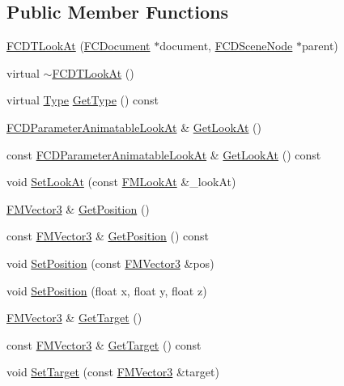 \subsection*{Public Member Functions}
\begin{DoxyCompactItemize}
\item 
\hyperlink{classFCDTLookAt_a8503ff0935502f743f1234cea3182ee0}{FCDTLookAt} (\hyperlink{classFCDocument}{FCDocument} $\ast$document, \hyperlink{classFCDSceneNode}{FCDSceneNode} $\ast$parent)
\item 
virtual \hyperlink{classFCDTLookAt_ae544b67a4f54cc5f8a1a64d2de11292a}{$\sim$FCDTLookAt} ()
\item 
virtual \hyperlink{classFCDTransform_a13e561c5e53aeaf84dedf4661cdc8921}{Type} \hyperlink{classFCDTLookAt_a1f3fc1c2e95176026628276ddf6f30a0}{GetType} () const 
\item 
\hyperlink{classFCDParameterAnimatableT}{FCDParameterAnimatableLookAt} \& \hyperlink{classFCDTLookAt_a755e41f51da21c8f949b6623ef017664}{GetLookAt} ()
\item 
const \hyperlink{classFCDParameterAnimatableT}{FCDParameterAnimatableLookAt} \& \hyperlink{classFCDTLookAt_a4e98b5132697693cd67bad673563eba0}{GetLookAt} () const 
\item 
void \hyperlink{classFCDTLookAt_a18ceb4f6d6edd22c92f46d1a2005def9}{SetLookAt} (const \hyperlink{classFMLookAt}{FMLookAt} \&\_\-lookAt)
\item 
\hyperlink{classFMVector3}{FMVector3} \& \hyperlink{classFCDTLookAt_aed9285b26df96252f27c619eb7d4206e}{GetPosition} ()
\item 
const \hyperlink{classFMVector3}{FMVector3} \& \hyperlink{classFCDTLookAt_aa1fed9d62a50ced26db28b139787c4ad}{GetPosition} () const 
\item 
void \hyperlink{classFCDTLookAt_a829becc1363d90854e74b8a7f202081e}{SetPosition} (const \hyperlink{classFMVector3}{FMVector3} \&pos)
\item 
void \hyperlink{classFCDTLookAt_a4c9374a9d4a6c78ffd1fab74389d1cd8}{SetPosition} (float x, float y, float z)
\item 
\hyperlink{classFMVector3}{FMVector3} \& \hyperlink{classFCDTLookAt_ac2c36146acd0a09d093fe1745a8ac2bb}{GetTarget} ()
\item 
const \hyperlink{classFMVector3}{FMVector3} \& \hyperlink{classFCDTLookAt_a2e86cb4fd7d215dcd20cb816fb075614}{GetTarget} () const 
\item 
void \hyperlink{classFCDTLookAt_abf1643d2b5658fc77a1f01eeb1c186a7}{SetTarget} (const \hyperlink{classFMVector3}{FMVector3} \&target)

\end{DoxyCompactItemize}
